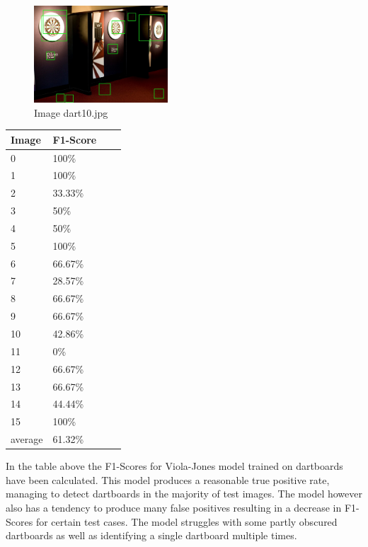 \documentclass[conference]{IEEEtran}
\begin{document}
\begin{figure}[ht!]
	\centering
	\includegraphics[width=50mm]{img/Viola_Jones_Darts/detected_dart10.jpg}
	\caption{Image dart10.jpg \label{img_dart_10}}
\end{figure}

\begin{center}
	\begin{tabular}{| l | l | l | l |}
		\hline
		Image & F1-Score \\ \hline
	    0 & 100\% \\ \hline
		1 & 100\% \\ \hline
		2 & 33.33\% \\ \hline
		3 &  50\%\\ \hline
		4 & 50\% \\ \hline
		5 & 100\% \\ \hline
		6 & 66.67\% \\ \hline
		7 & 28.57\% \\ \hline
		8 & 66.67\% \\ \hline
		9 & 66.67\% \\ \hline
		10 & 42.86\% \\ \hline
		11 & 0\% \\ \hline
		12 & 66.67\% \\ \hline
		13 & 66.67\% \\ \hline
		14 & 44.44\% \\ \hline
		15 & 100\% \\ \hline
		average & 61.32\% \\ \hline
	\end{tabular}
\end{center}

In the table above the F1-Scores for Viola-Jones model trained on dartboards have been calculated. This model produces a reasonable true positive rate, managing to detect dartboards in the majority of test images. The model however also has a tendency to produce many false positives resulting in a decrease in F1-Scores for certain test cases. The model struggles with some partly obscured dartboards as well as identifying a single dartboard multiple times.
\end{document}
